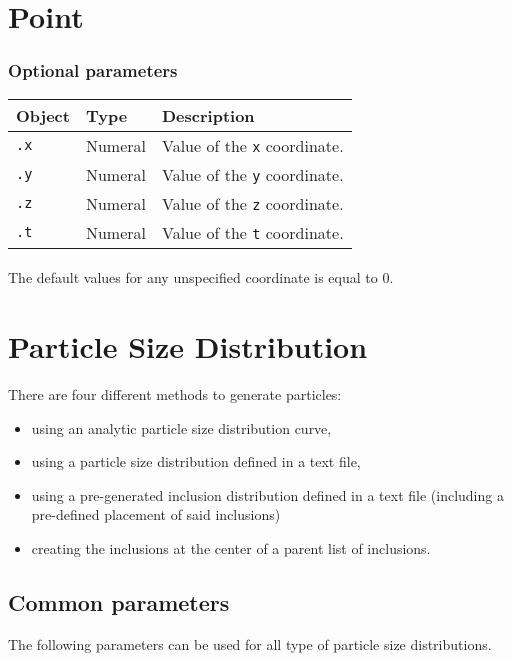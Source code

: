 \documentclass[10pt]{article}
\begin{document}
\section{Point}

\subsubsection*{Optional parameters}

\begin{tabularx}{\textwidth}{llX}
\hline 
Object & Type & Description \\ 
\hline 
\verb+.x+ & Numeral & Value of the \verb+x+ coordinate.\\ 
\verb+.y+ & Numeral & Value of the \verb+y+ coordinate.\\ 
\verb+.z+ & Numeral & Value of the \verb+z+ coordinate.\\ 
\verb+.t+ & Numeral & Value of the \verb+t+ coordinate.\\ 
\hline 
\end{tabularx}

\paragraph{} The default values for any unspecified coordinate is equal to 0.

\section{Particle Size Distribution}

There are four different methods to generate particles:
\begin{itemize}
	\item using an analytic particle size distribution curve,
	\item using a particle size distribution defined in a text file,
	\item using a pre-generated inclusion distribution defined in a text file (including a pre-defined placement of said inclusions)
	\item creating the inclusions at the center of a parent list of inclusions.
\end{itemize}

\subsection{Common parameters}

The following parameters can be used for all type of particle size distributions.
\end{document}
